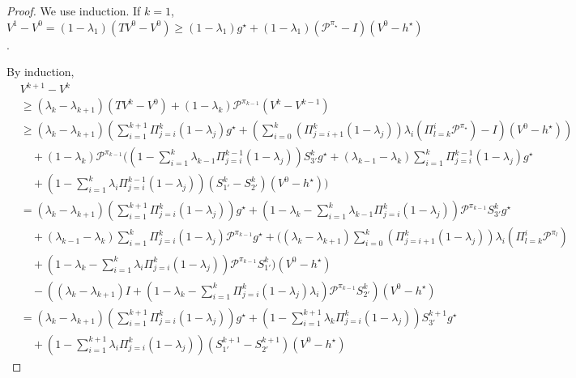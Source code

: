 \documentclass{article} %
\newcommand{\cP}{\mathcal{P}}
\newcommand*{\para}[1]{\left({#1}\right)}
\begin{document}
\begin{proof}
We use induction. If $k=1$, $V^1-V^0 = (1-\lambda_1)(TV^0-V^0) \ge (1-\lambda_1)g^{\star}+(1-\lambda_1)(\cP^{\pi_{\star}}-I)(V^0-h^{\star})$.

By induction,
\begin{align*}
    &V^{k+1}-V^{k}
     \\ & \ge (\lambda_{k}-\lambda_{k+1})(TV^{k} -V^{0})+(1-\lambda_{k})\cP^{\pi_{k-1}}(V^{k} -V^{k-1})
         \\ & \ge (\lambda_{k}-\lambda_{k+1}) \para{ \sum_{i=1}^{k+1} \Pi^{k}_{j=i} (1-\lambda_j)g^{\star}  +\para{\sum_{i=0}^{k} (\Pi^k_{j=i+1} (1-\lambda_j)) \lambda_{i}\para{\Pi^{i}_{l=k}\cP^{\pi_{\star}}}-I}(V^0-h^{\star})}
    \\& \quad + (1-\lambda_{k})\cP^{\pi_{k-1}} \Bigg(\para{1-\sum_{i=1}^{k} \lambda_{k-1} \Pi^{k-1}_{j=i} (1-\lambda_j)}S_{3'}^{k}g^{\star} +(\lambda_{k-1}-\lambda_{k})  \sum_{i=1}^{k} \Pi^{k-1}_{j=i} (1-\lambda_j)g^{\star}
    \\& \quad + \para{1-\sum_{i=1}^{k} \lambda_i \Pi^{k-1}_{j=i} (1-\lambda_j)}(S^{k}_{1'} -S^{k}_{2'})(V^0-h^{\star})\Bigg)
    \end{align*}
    \begin{align*}
     & = (\lambda_{k}-\lambda_{k+1}) \para{ \sum_{i=1}^{k+1} \Pi^{k}_{j=i} (1-\lambda_j)}g^{\star}+\para{1-\lambda_k-\sum_{i=1}^{k} \lambda_{k-1} \Pi^{k}_{j=i} (1-\lambda_j)}\cP^{\pi_{k-1}}S^k_{3'}g^{\star}
             \\& \quad +(\lambda_{k-1}-\lambda_{k})  \sum_{i=1}^{k} \Pi^{k}_{j=i} (1-\lambda_j)\cP^{\pi_{k-1}}g^{\star}+ \Bigg((\lambda_{k}-\lambda_{k+1})\sum_{i=0}^{k} (\Pi^k_{j=i+1} (1-\lambda_j)) \lambda_{i}\para{\Pi^{i}_{l=k}\cP^{\pi_l}}
             \\& \quad +\para{1-\lambda_k-\sum_{i=1}^{k} \lambda_i \Pi^{k}_{j=i} (1-\lambda_j)}\cP^{\pi_{k-1}}S^k_{1'}\Bigg)(V^0-h^{\star})
    \\& \quad - \para{(\lambda_{k}-\lambda_{k+1})I+\para{1-\lambda_k-\sum_{i=1}^{k}  \Pi^{k}_{j=i} (1-\lambda_j)\lambda_i}\cP^{\pi_{k-1}}S^{k}_{2'}}(V^0-h^{\star})
    \\& = (\lambda_{k}-\lambda_{k+1}) \para{ \sum_{i=1}^{k+1} \Pi^{k}_{j=i} (1-\lambda_j)}g^{\star}+\para{1-\sum_{i=1}^{k+1} \lambda_{k} \Pi^{k}_{j=i} (1-\lambda_j)}S^{k+1}_{3'}g^{\star} 
    \\& \quad + \para{1-\sum_{i=1}^{k+1} \lambda_i \Pi^{k}_{j=i} (1-\lambda_j)}(S^{k+1}_{1'} -S^{k+1}_{2'})(V^0-h^{\star})
\end{align*}   

\end{proof}
\end{document}
